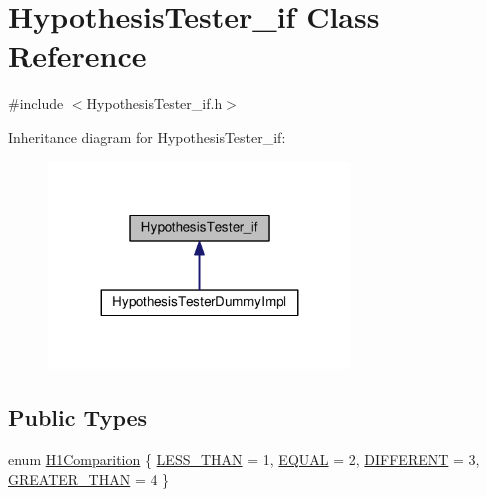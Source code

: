 \hypertarget{class_hypothesis_tester__if}{}\section{Hypothesis\+Tester\+\_\+if Class Reference}
\label{class_hypothesis_tester__if}


{\ttfamily \#include $<$Hypothesis\+Tester\+\_\+if.\+h$>$}



Inheritance diagram for Hypothesis\+Tester\+\_\+if\+:
\nopagebreak
\begin{figure}[H]
\begin{center}
\leavevmode
\includegraphics[width=227pt]{class_hypothesis_tester__if__inherit__graph}
\end{center}
\end{figure}
\subsection*{Public Types}
\begin{DoxyCompactItemize}
\item 
enum \hyperlink{class_hypothesis_tester__if_a89153ff990252f9f79856a2f2532c349}{H1\+Comparition} \{ \hyperlink{class_hypothesis_tester__if_a89153ff990252f9f79856a2f2532c349a58aba9f031dcbe91654e790416d84969}{L\+E\+S\+S\+\_\+\+T\+H\+AN} = 1, 
\hyperlink{class_hypothesis_tester__if_a89153ff990252f9f79856a2f2532c349a42d8b143727dc6856dddb0d0ce94c791}{E\+Q\+U\+AL} = 2, 
\hyperlink{class_hypothesis_tester__if_a89153ff990252f9f79856a2f2532c349acf8c0147414ce2a7cfdc8b26854464f8}{D\+I\+F\+F\+E\+R\+E\+NT} = 3, 
\hyperlink{class_hypothesis_tester__if_a89153ff990252f9f79856a2f2532c349ad0539d107f27b07e600a3c46da5b1934}{G\+R\+E\+A\+T\+E\+R\+\_\+\+T\+H\+AN} = 4
 \}
\end{DoxyCompactItemize}
